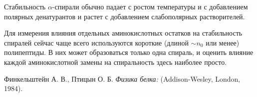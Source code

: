 \documentclass[
11pt,%
tightenlines,%
twoside,%
onecolumn,%
nofloats,%
nobibnotes,%
nofootinbib,%
superscriptaddress,%
noshowpacs,%
centertags]%
{revtex4}
\begin{document}
Стабильность $\alpha$-спирали обычно падает с ростом температуры и с добавлением полярных денатурантов и растет с добавлением слабополярных растворителей.

Для измерения влияния отдельных аминокислотных остатков на стабильность спиралей сейчас чаще всего используются короткие (длиной $\sim n_0$ или менее) полипептиды. В них может образоваться только одна спираль, и оценить влияние каждой аминокислотной замены на спиральность здесь наиболее просто. 

%
%

\begin{thebibliography}{99}
Финкельштейн А. В., Птицын О. Б. \emph{Физика белка:} (Addison-Wesley, London, 1984).




\end{thebibliography}
\end{document}
